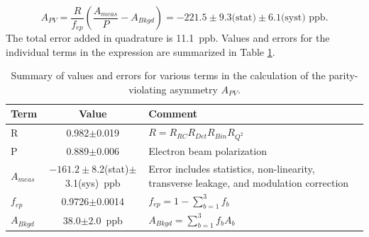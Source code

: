 \begin{equation}
A_{PV}=\frac{R}{f_{ep}}\left(\frac{A_{meas}}{P}-A_{Bkgd}\right)= -221.5\pm 9.3\text{(stat)}\pm 6.1\text{(syst)~ppb}.
\label{eq:apv_exp}
\end{equation}
The total error added in quadrature is 11.1~ppb. Values and errors for the individual terms in the expression are summarized in Table \ref{tab:asym_err}.



\begin{table}[h]
\begin{center}
\caption{\label{tab:asym_err}Summary of values and errors for various terms in the calculation of the parity-violating asymmetry $A_{PV}$. }
\begin{tabular}{|l|c|p{5cm}|}\hline
Term&Value&Comment\\\hline\hline
R&0.982$\pm$0.019&$R=R_{RC}R_{Det}R_{Bin}R_{Q^2}$\\\hline
P&0.889$\pm$0.006&Electron beam polarization\\\hline
$A_{meas}$&$-161.2\pm$8.2(stat)$\pm$3.1(sys)~ppb&Error includes statistics, non-linearity, transverse leakage, and modulation correction\\\hline
$f_{ep}$&0.9726$\pm$0.0014&$f_{ep}=1-\sum_{b=1}^3f_b$\\\hline
$A_{Bkgd}$&38.0$\pm$2.0~ppb&$A_{Bkgd}=\sum_{b=1}^3f_bA_b$\\\hline
\end{tabular}
\end{center}
\end{table}

